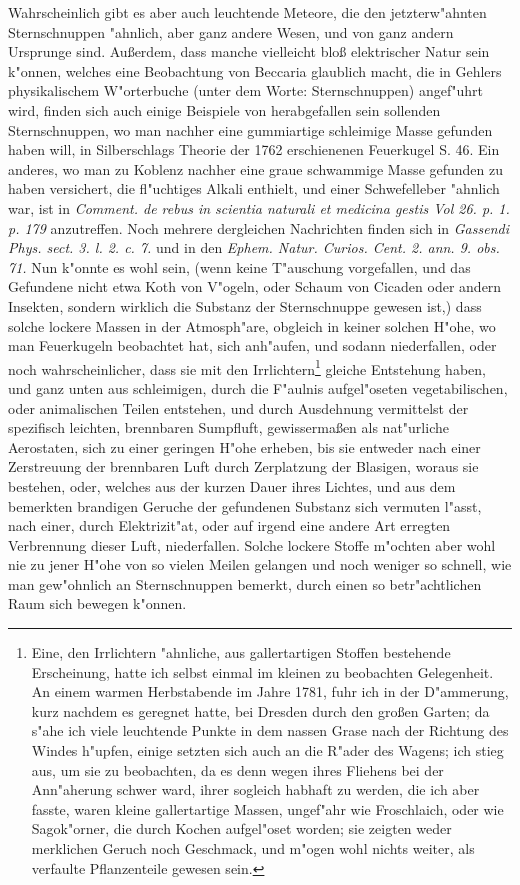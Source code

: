 \documentclass[a4paper, 11pt, oneside, polutonikogreek, german]{article}
\begin{document}
Wahrscheinlich gibt es aber auch leuchtende Meteore, die den jetzterw"ahnten Sternschnuppen "ahnlich, aber ganz andere Wesen, und von ganz andern Ursprunge sind. Außerdem, dass manche vielleicht bloß elektrischer Natur sein k"onnen, welches eine Beobachtung von Beccaria glaublich macht, die in Gehlers physikalischem W"orterbuche (unter dem Worte: Sternschnuppen) angef"uhrt wird, finden sich auch einige Beispiele von herabgefallen sein sollenden Sternschnuppen, wo man nachher eine gummiartige schleimige Masse gefunden haben will, in Silberschlags Theorie der 1762 erschienenen Feuerkugel S. 46. Ein anderes, wo man zu Koblenz nachher eine graue schwammige Masse gefunden zu haben versichert, die fl"uchtiges Alkali enthielt, und einer Schwefelleber "ahnlich war, ist in \emph{Comment. de rebus in scientia naturali et medicina gestis Vol 26. p. 1. p. 179} anzutreffen. Noch mehrere dergleichen Nachrichten finden sich in \emph{Gassendi Phys. sect. 3. l. 2. c. 7.} und in den \emph{Ephem. Natur. Curios. Cent. 2. ann. 9. obs. 71.} Nun k"onnte es wohl sein, (wenn keine T"auschung vorgefallen, und das Gefundene nicht etwa Koth von V"ogeln, oder Schaum von Cicaden oder andern Insekten, sondern wirklich die Substanz der Sternschnuppe gewesen ist,) dass solche lockere Massen in der Atmosph"are, obgleich in keiner solchen H"ohe, wo man Feuerkugeln beobachtet hat, sich anh"aufen, und sodann niederfallen, oder noch wahrscheinlicher, dass sie mit den Irrlichtern\footnote{Eine, den Irrlichtern "ahnliche, aus gallertartigen Stoffen bestehende Erscheinung, hatte ich selbst einmal im kleinen zu beobachten Gelegenheit. An einem warmen Herbstabende im Jahre 1781, fuhr ich in der D"ammerung, kurz nachdem es geregnet hatte, bei Dresden durch den großen Garten; da s"ahe ich viele leuchtende Punkte in dem nassen Grase nach der Richtung des Windes h"upfen, einige setzten sich auch an die R"ader des Wagens; ich stieg aus, um sie zu beobachten, da es denn wegen ihres Fliehens bei der Ann"aherung schwer ward, ihrer sogleich habhaft zu werden, die ich aber fasste, waren kleine gallertartige Massen, ungef"ahr wie Froschlaich, oder wie Sagok"orner, die durch Kochen aufgel"oset worden; sie zeigten weder merklichen Geruch noch Geschmack, und m"ogen wohl nichts weiter, als verfaulte Pflanzenteile gewesen sein.} gleiche Entstehung haben, und ganz unten aus schleimigen, durch die F"aulnis aufgel"oseten vegetabilischen, oder animalischen Teilen entstehen, und durch Ausdehnung vermittelst der spezifisch leichten, brennbaren Sumpfluft, gewissermaßen als nat"urliche Aerostaten, sich zu einer geringen H"ohe erheben, bis sie entweder nach einer Zerstreuung der brennbaren Luft durch Zerplatzung der Blasigen, woraus sie bestehen, oder, welches aus der kurzen Dauer ihres Lichtes, und aus dem bemerkten brandigen Geruche der gefundenen Substanz sich vermuten l"asst, nach einer, durch Elektrizit"at, oder auf irgend eine andere Art erregten Verbrennung dieser Luft, niederfallen. Solche lockere Stoffe m"ochten aber wohl nie zu jener H"ohe von so vielen Meilen gelangen und noch weniger so schnell, wie man gew"ohnlich an Sternschnuppen bemerkt, durch einen so betr"achtlichen Raum sich bewegen k"onnen.
\clearpage
\end{document}
